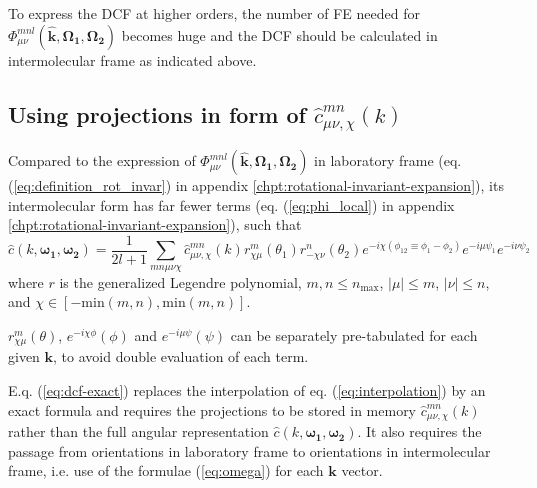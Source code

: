 To express the DCF at higher orders, the number of FE needed for $\Phi_{\mu\nu}^{mnl}(\mathbf{\hat{k}},\mathbf{\Omega_{1}},\mathbf{\Omega_{2}})$
becomes huge and the DCF should be calculated in intermolecular frame
as indicated above.


\subsection{Using projections in form of $\hat{c}_{\mu\nu,\chi}^{mn}(k)$\label{sub:Using-projections-in-1}}

Compared to the expression of $\Phi_{\mu\nu}^{mnl}(\mathbf{\hat{k}},\mathbf{\Omega_{1}},\mathbf{\Omega_{2}})$
in laboratory frame (eq. (\ref{eq:definition_rot_invar}) in appendix
\ref{chpt:rotational-invariant-expansion}), its intermolecular form
has far fewer terms (eq. (\ref{eq:phi_local}) in appendix \ref{chpt:rotational-invariant-expansion}),
such that
\begin{equation}
\hat{c}(k,\boldsymbol{\omega_{1}},\boldsymbol{\omega_{2}})=\frac{1}{2l+1}\sum_{mn\mu\nu\chi}\hat{c}_{\mu\nu,\chi}^{mn}(k)r_{\chi\mu}^{m}(\theta_{1})r_{-\chi\nu}^{n}(\theta_{2})e^{-i\chi(\phi_{12}\equiv\phi_{1}-\phi_{2})}e^{-i\mu\psi_{1}}e^{-i\nu\psi_{2}}\label{eq:dcf-exact}
\end{equation}
where $r$ is the generalized Legendre polynomial, $m,n\leq n{}_{\mathrm{max}}$,
$\left|\mu\right|\leq m$, $\left|\nu\right|\leq n$, and $\chi\in\left[-\mathrm{min}(m,n),\mathrm{min}(m,n)\right]$.

$r_{\chi\mu}^{m}(\theta)$, $e^{-i\chi\phi}(\phi)$ and $e^{-i\mu\psi}(\psi)$
can be separately pre-tabulated for each given $\mathbf{k}$, to avoid
double evaluation of each term.

E.q. (\ref{eq:dcf-exact}) replaces the interpolation of eq. (\ref{eq:interpolation})
by an exact formula and requires the projections to be stored in memory 
$\hat{c}_{\mu\nu,\chi}^{mn}(k)$ rather than the full angular representation
$\hat{c}(k,\boldsymbol{\omega_{1}},\boldsymbol{\omega_{2}})$. It
also requires the passage from orientations in laboratory frame
to orientations in intermolecular frame, i.e. use of the formulae
(\ref{eq:omega}) for each $\mathbf{k}$ vector.
